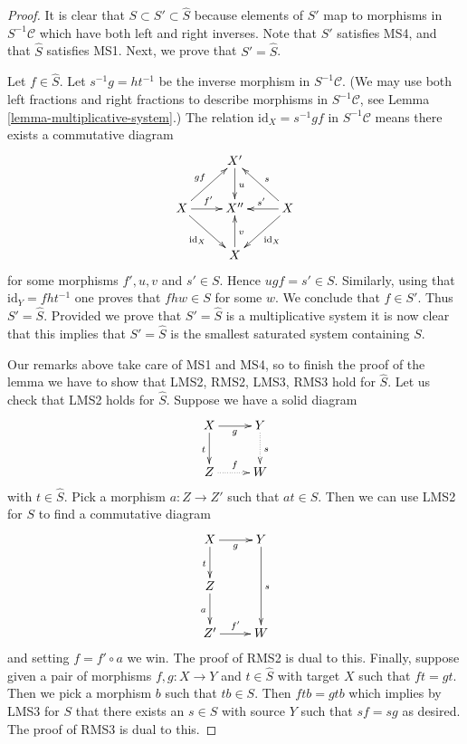 \begin{proof}
It is clear that $S \subset S' \subset \hat S$ because elements of
$S'$ map to morphisms in $S^{-1}\mathcal{C}$ which have both left
and right inverses. Note that $S'$ satisfies MS4, and that
$\hat S$ satisfies MS1. Next, we prove that $S' = \hat S$.

\medskip\noindent
Let $f \in \hat S$. Let $s^{-1}g = ht^{-1}$ be the inverse morphism
in $S^{-1}\mathcal{C}$. (We may use both left fractions and right
fractions to describe morphisms in $S^{-1}\mathcal{C}$, see
Lemma \ref{lemma-multiplicative-system}.)
The relation $\text{id}_X = s^{-1}gf$ in $S^{-1}\mathcal{C}$ means
there exists a commutative diagram
$$
\xymatrix{
 & X' \ar[d]^u & \\
X \ar[ru]^{gf} \ar[r]^{f'} \ar[rd]_{\text{id}_X} &
X'' &
X \ar[lu]_s \ar[l]_{s'} \ar[ld]^{\text{id}_X} \\
& X \ar[u]_v &
}
$$
for some morphisms $f', u, v$ and $s' \in S$. Hence $ugf = s' \in S$.
Similarly, using that $\text{id}_Y = fht^{-1}$ one proves that
$fhw \in S$ for some $w$. We conclude that $f \in S'$. Thus
$S' = \hat S$. Provided we prove that $S' = \hat S$ is a
multiplicative system it is now clear that this implies that $S' = \hat S$
is the smallest saturated system containing $S$.

\medskip\noindent
Our remarks above take care of MS1 and MS4, so to finish the proof of the
lemma we have to show that LMS2, RMS2, LMS3, RMS3 hold for $\hat S$.
Let us check that LMS2 holds for $\hat S$. Suppose we have a solid diagram 
$$
\xymatrix{
X \ar[d]_t \ar[r]_g & Y \ar@{..>}[d]^s \\
Z \ar@{..>}[r]^f & W
}
$$
with $t \in \hat S$. Pick a morphism $a : Z \to Z'$ such that
$at \in S$. Then we can use LMS2 for $S$ to find a commutative diagram
$$
\xymatrix{
X \ar[d]_t \ar[r]_g & Y \ar[dd]^s \\
Z \ar[d]_a  \\
Z' \ar[r]^{f'} & W
}
$$
and setting $f = f' \circ a$ we win. The proof of RMS2 is dual to this.
Finally, suppose given a pair of morphisms $f, g : X \to Y$ and
$t \in \hat S$ with target $X$ such that $ft = gt$.
Then we pick a morphism $b$ such that $tb \in S$. Then
$ftb = gtb$ which implies by LMS3 for $S$ that there exists an $s \in S$
with source $Y$ such that $sf = sg$ as desired. The proof of
RMS3 is dual to this.
\end{proof}








